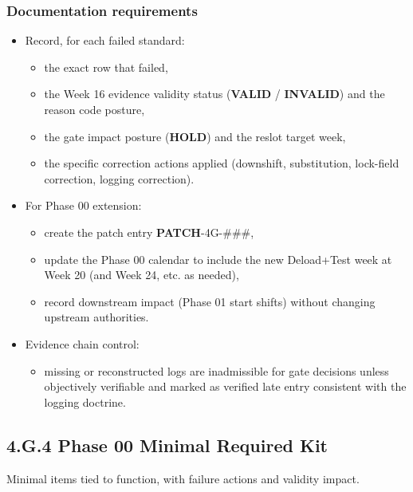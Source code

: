 \documentclass[10pt]{article}
\begin{document}
\subsubsection*{Documentation requirements}

\begin{itemize}
\item Record, for each failed standard:
  \begin{itemize}
  \item the exact row that failed,
  \item the Week 16 evidence validity status (\textbf{VALID} / \textbf{INVALID}) and the reason code posture,
  \item the gate impact posture (\textbf{HOLD}) and the reslot target week,
  \item the specific correction actions applied (downshift, substitution, lock-field correction, logging correction).
  \end{itemize}
\item For Phase 00 extension:
  \begin{itemize}
  \item create the patch entry \textbf{PATCH}-4G-\#\#\#,
  \item update the Phase 00 calendar to include the new Deload+Test week at Week 20 (and Week 24, etc. as needed),
  \item record downstream impact (Phase 01 start shifts) without changing upstream authorities.
  \end{itemize}
\item Evidence chain control:
  \begin{itemize}
  \item missing or reconstructed logs are inadmissible for gate decisions unless objectively verifiable and marked as verified late entry consistent with the logging doctrine.
  \end{itemize}
\end{itemize}

\subsection*{4.G.4 Phase 00 Minimal Required Kit}
{}

Minimal items tied to function, with failure actions and validity impact.
\end{document}
